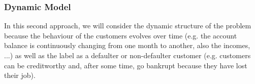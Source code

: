 

\subsubsection*{Dynamic Model} 

In this second approach, we will consider the dynamic structure of the problem because the behaviour of the customers evolves over time (e.g. the account balance is continuously changing from one month to another, also the incomes, ...)  as well as the label as a defaulter or non-defaulter customer (e.g. customers can be creditworthy and, after some time, go bankrupt because they have lost their job). 


